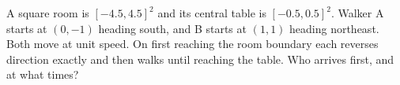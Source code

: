 A square room is $[-4.5,4.5]^2$ and its central table is $[-0.5,0.5]^2$. Walker A starts at $(0,-1)$ heading south, and B starts at $(1,1)$ heading northeast. Both move at unit speed. On first reaching the room boundary each reverses direction exactly and then walks until reaching the table. Who arrives first, and at what times?
